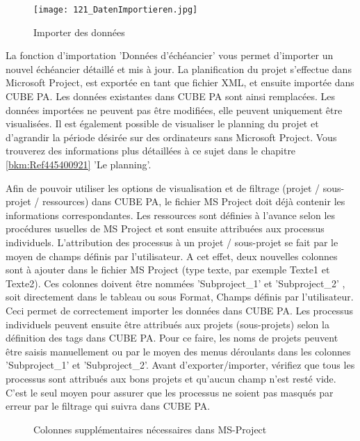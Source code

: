 \begin{figure}
\vspace{-15pt}
\texttt{[image: 121\_DatenImportieren.jpg]}
\caption{Importer des données}
\end{figure}
La fonction d'importation 'Données d'échéancier' vous permet d'importer un nouvel échéancier détaillé et mis à jour. La planification du projet s'effectue dans Microsoft Project, est exportée en tant que fichier XML, et ensuite importée dans CUBE PA. Les données existantes dans CUBE PA sont ainsi remplacées. Les données importées ne peuvent pas être modifiées, elle peuvent uniquement être visualisées. Il est également possible de visualiser le planning du projet et d'agrandir la période désirée sur des ordinateurs sans Microsoft Project. Vous trouverez des informations plus détaillées à ce sujet dans le chapitre \ref{bkm:Ref445400921} 'Le planning'.

\vspace{\baselineskip}

Afin de pouvoir utiliser les options de visualisation et de filtrage (projet / sous-projet / ressources) dans CUBE PA, le fichier MS Project doit déjà contenir les informations correspondantes. Les ressources sont définies à l'avance selon les procédures usuelles de MS Project et sont ensuite attribuées aux processus individuels. L'attribution des processus à un projet / sous-projet se fait par le moyen de champs définis par l'utilisateur. A cet effet, deux nouvelles colonnes sont à ajouter dans le fichier MS Project (type texte, par exemple Texte1 et Texte2). Ces colonnes doivent être nommées 'Subproject\_1' et 'Subproject\_2' , soit directement dans le tableau ou sous Format, Champs définis par l'utilisateur. Ceci permet de correctement importer les données dans CUBE PA. Les processus individuels peuvent ensuite être attribués aux projets (sous-projets) selon la définition des tags dans CUBE PA. Pour ce faire, les noms de projets peuvent être saisis manuellement ou par le moyen des menus déroulants dans les colonnes 'Subproject\_1' et 'Subproject\_2'. Avant d'exporter/importer, vérifiez que tous les processus sont attribués aux bons projets et qu'aucun champ n'est resté vide. C'est le seul moyen pour assurer que les processus ne soient pas masqués par erreur par le filtrage qui suivra dans CUBE PA.

\begin{figure}[H]
\caption{Colonnes supplémentaires nécessaires dans MS-Project}
\end{figure}

